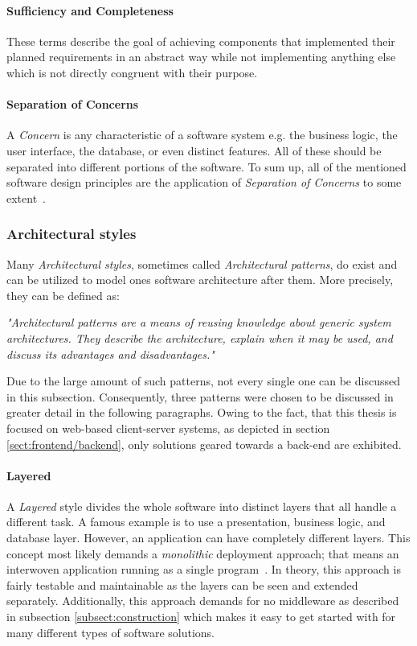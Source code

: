 \documentclass[12pt,a4paper,twoside]{report}
\begin{document}
\paragraph{Sufficiency and Completeness}
These terms describe the goal of achieving components that implemented their
planned requirements in an abstract way while not implementing anything else
which is not directly congruent with their purpose.

\paragraph{Separation of Concerns}
A \textit{Concern} is any characteristic of a software system
e.g. the business logic, the user interface, the database, or even distinct features.
All of these should be separated into different portions of the software.
To sum up, all of the mentioned software design principles are the application
of \textit{Separation of Concerns} to some extent~\cite{mitchell-managing-se}.


\subsubsection{Architectural styles} \label{subsubsect:architectural-styles}

Many \textit{Architectural styles}, sometimes called \textit{Architectural patterns},
do exist and can be utilized to model ones software architecture after them.
More precisely, they can be defined as:
\begin{displayquote}
\emph{"Architectural patterns are a means of reusing knowledge about
generic system architectures. They describe the architecture,
explain when it may be used, and discuss its advantages and disadvantages."}~\cite{sommerville-se}
\end{displayquote}
Due to the large amount of such patterns, not every single one can be discussed
in this subsection. Consequently, three patterns were chosen to be discussed
in greater detail in the following paragraphs. Owing to the fact, that this
thesis is focused on web-based client-server systems, as depicted in
section \ref{sect:frontend/backend}, only solutions geared towards a back-end are exhibited.

\paragraph{Layered}
A \textit{Layered} style divides the whole software into distinct layers that
all handle a different task. A famous example is to use a presentation,
business logic, and database layer. However, an application can have completely different
layers. This concept most likely demands a \textit{monolithic} deployment approach;
that means an interwoven application running as a single program~\cn.
In theory, this approach is fairly testable and maintainable
as the layers can be seen and extended separately. Additionally, this approach demands
for no middleware as described in subsection \ref{subsect:construction} which
makes it easy to get started with for many different types of software solutions.
\end{document}
